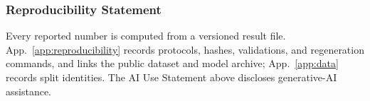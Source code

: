 \documentclass{article}
\newcommand{\1}{\mathbf 1}
\theoremstyle{remark}
\theoremstyle{definition}
\theoremstyle{plain}
\begin{document}
\subsubsection*{Reproducibility Statement}

Every reported number is computed from a versioned result file.
App.~\ref{app:reproducibility} records protocols, hashes, validations,
and regeneration commands, and links the public dataset and model archive;
App.~\ref{app:data} records split identities.
The AI Use Statement above discloses generative-AI assistance.
\end{document}
